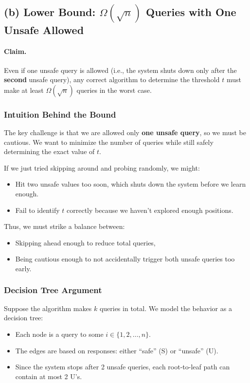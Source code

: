 \documentclass[12pt]{article}
\begin{document}
	\subsection*{(b) Lower Bound: $\Omega(\sqrt{n})$ Queries with One Unsafe Allowed}
	
	\paragraph{Claim.} Even if one unsafe query is allowed (i.e., the system shuts down only after the \textbf{second} unsafe query), any correct algorithm to determine the threshold $t$ must make at least $\Omega(\sqrt{n})$ queries in the worst case.
	
	\subsubsection*{Intuition Behind the Bound}
	The key challenge is that we are allowed only \textbf{one unsafe query}, so we must be cautious. We want to minimize the number of queries while still safely determining the exact value of $t$. 
	
	If we just tried skipping around and probing randomly, we might:
	\begin{itemize}
		\item Hit two unsafe values too soon, which shuts down the system before we learn enough.
		\item Fail to identify $t$ correctly because we haven't explored enough positions.
	\end{itemize}
	
	Thus, we must strike a balance between:
	\begin{itemize}
		\item Skipping ahead enough to reduce total queries,
		\item Being cautious enough to not accidentally trigger both unsafe queries too early.
	\end{itemize}
	
	\subsubsection*{Decision Tree Argument}
	
	Suppose the algorithm makes $k$ queries in total. We model the behavior as a decision tree:
	\begin{itemize}
		\item Each node is a query to some $i \in \{1, 2, \dots, n\}$.
		\item The edges are based on responses: either ``safe'' (S) or ``unsafe'' (U).
		\item Since the system stops after 2 unsafe queries, each root-to-leaf path can contain at most 2 U's.
	\end{itemize}
	
\end{document}
